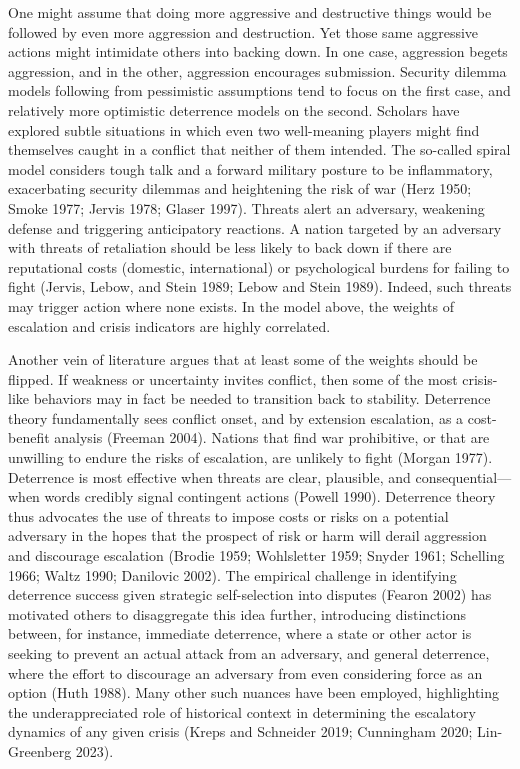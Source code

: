 \documentclass[
  letterpaper,
  DIV=11,
  numbers=noendperiod]{scrartcl}
\begin{document}
One might assume that doing more aggressive and destructive things would
be followed by even more aggression and destruction. Yet those same
aggressive actions might intimidate others into backing down. In one
case, aggression begets aggression, and in the other, aggression
encourages submission. Security dilemma models following from
pessimistic assumptions tend to focus on the first case, and relatively
more optimistic deterrence models on the second. Scholars have explored
subtle situations in which even two well-meaning players might find
themselves caught in a conflict that neither of them intended. The
so-called spiral model considers tough talk and a forward military
posture to be inflammatory, exacerbating security dilemmas and
heightening the risk of war (Herz 1950; Smoke 1977; Jervis 1978; Glaser
1997). Threats alert an adversary, weakening defense and triggering
anticipatory reactions. A nation targeted by an adversary with threats
of retaliation should be less likely to back down if there are
reputational costs (domestic, international) or psychological burdens
for failing to fight (Jervis, Lebow, and Stein 1989; Lebow and Stein
1989). Indeed, such threats may trigger action where none exists. In the
model above, the weights of escalation and crisis indicators are highly
correlated.

Another vein of literature argues that at least some of the weights
should be flipped. If weakness or uncertainty invites conflict, then
some of the most crisis-like behaviors may in fact be needed to
transition back to stability. Deterrence theory fundamentally sees
conflict onset, and by extension escalation, as a cost-benefit analysis
(Freeman 2004). Nations that find war prohibitive, or that are unwilling
to endure the risks of escalation, are unlikely to fight (Morgan 1977).
Deterrence is most effective when threats are clear, plausible, and
consequential---when words credibly signal contingent actions (Powell
1990). Deterrence theory thus advocates the use of threats to impose
costs or risks on a potential adversary in the hopes that the prospect
of risk or harm will derail aggression and discourage escalation (Brodie
1959; Wohlsletter 1959; Snyder 1961; Schelling 1966; Waltz 1990;
Danilovic 2002). The empirical challenge in identifying deterrence
success given strategic self-selection into disputes (Fearon 2002) has
motivated others to disaggregate this idea further, introducing
distinctions between, for instance, immediate deterrence, where a state
or other actor is seeking to prevent an actual attack from an adversary,
and general deterrence, where the effort to discourage an adversary from
even considering force as an option (Huth 1988). Many other such nuances
have been employed, highlighting the underappreciated role of historical
context in determining the escalatory dynamics of any given crisis
(Kreps and Schneider 2019; Cunningham 2020; Lin-Greenberg 2023).
\end{document}
